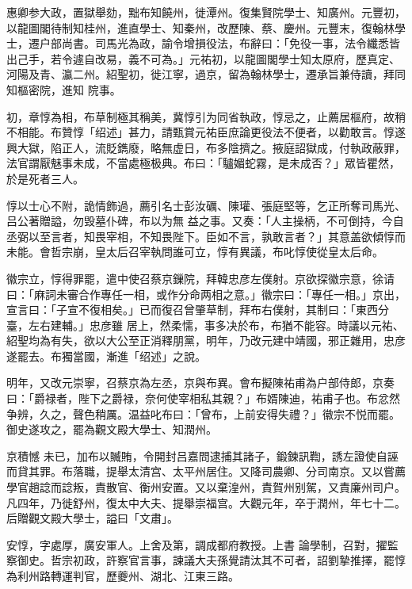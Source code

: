 \begin{pinyinscope}
 惠卿参大政，置獄舉劾，黜布知饒州，徙潭州。復集賢院學士、知廣州。元豐初，以龍圖閣待制知桂州，進直學士、知秦州，改歷陳、蔡、慶州。元豐末，復翰林學士，遷户部尚書。司馬光為政，諭令增損役法，布辭曰：「免役一事，法令纖悉皆出己手，若令遽自改易，義不可為。」元祐初，以龍圖閣學士知太原府，歷真定、河陽及青、瀛二州。紹聖初，徙江寧，過京，留為翰林學士，遷承旨兼侍讀，拜同知樞密院，進知
 院事。



 初，章惇為相，布草制極其稱美，冀惇引为同省執政，惇忌之，止薦居樞府，故稍不相能。布贊惇「绍述」甚力，請甄賞元祐臣庶論更役法不便者，以勸敢言。惇遂興大獄，陷正人，流貶鐫廢，略無虚日，布多陰擠之。掖庭詔獄成，付執政蔽罪，法官謂厭魅事未成，不當處極极典。布曰：「驢媚蛇霧，是未成否？」眾皆瞿然，於是死者三人。



 惇以士心不附，詭情飾過，薦引名士彭汝礪、陳瓘、張庭堅等，乞正所奪司馬光、吕公著贈謚，勿毁墓仆碑，布以为無
 益之事。又奏：「人主操柄，不可倒持，今自丞弼以至言者，知畏宰相，不知畏陛下。臣如不言，孰敢言者？」其意盖欲傾惇而未能。會哲宗崩，皇太后召宰執問誰可立，惇有異議，布叱惇使從皇太后命。



 徽宗立，惇得罪罷，遣中使召蔡京鏁院，拜韓忠彦左僕射。京欲探徽宗意，徐请曰：「麻詞未審合作專任一相，或作分命两相之意。」徽宗曰：「專任一相。」京出，宣言曰：「子宣不復相矣。」已而復召曾肇草制，拜布右僕射，其制曰：「東西分臺，左右建輔。」忠彦雖
 居上，然柔懦，事多决於布，布猶不能容。時議以元祐、紹聖均為有失，欲以大公至正消釋朋黨，明年，乃改元建中靖國，邪正雜用，忠彦遂罷去。布獨當國，漸進「绍述」之說。



 明年，又改元崇寧，召蔡京為左丞，京與布異。會布擬陳祐甫為户部侍郎，京奏曰：「爵禄者，陛下之爵禄，奈何使宰相私其親？」布婿陳迪，祐甫子也。布忿然争辨，久之，聲色稍厲。温益叱布曰：「曾布，上前安得失禮？」徽宗不悦而罷。御史遂攻之，罷為觀文殿大學士、知潤州。



 京積憾
 未已，加布以贓賄，令開封吕嘉問逮捕其諸子，鍛鍊訊鞫，誘左證使自誣而貸其罪。布落職，提舉太清宫、太平州居住。又降司農卿、分司南京。又以嘗薦學官趙諗而諗叛，責散官、衡州安置。又以棄湟州，責賀州别駕，又責廉州司户。凡四年，乃徙舒州，復太中大夫、提舉崇福宫。大觀元年，卒于潤州，年七十二。后贈觀文殿大學士，謚曰「文肅」。



 安惇，字處厚，廣安軍人。上舍及第，調成都府教授。上書
 論學制，召對，擢監察御史。哲宗初政，許察官言事，諫議大夫孫覺請汰其不可者，詔劉摯推擇，罷惇為利州路轉運判官，歷夔州、湖北、江東三路。




\end{pinyinscope}
